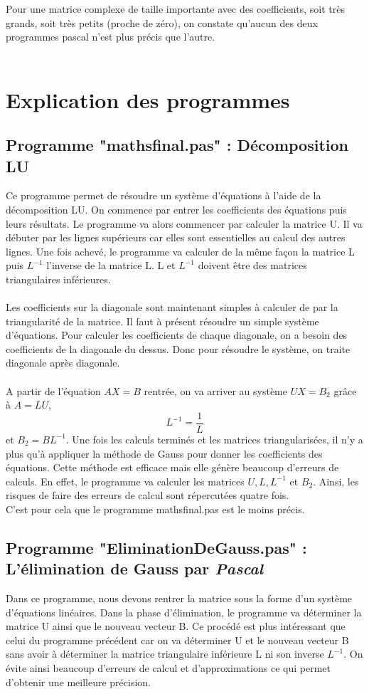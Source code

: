 \documentclass[a4paper,12pt]{report}
\begin{document}
Pour une matrice complexe de taille importante avec des coefficients, soit très grands, soit très petits (proche de zéro), on constate qu'aucun des deux programmes pascal n'est plus précis que l'autre.\\\\

\section{Explication des programmes}
\subsection{Programme "mathsfinal.pas" : Décomposition LU}

Ce programme permet de résoudre un système d'équations à l'aide de la décomposition LU.
On commence par entrer les coefficients des équations puis leurs résultats.
Le programme va alors commencer par calculer la matrice U. Il va débuter par les lignes  supérieurs car elles sont essentielles au calcul des autres lignes. Une fois achevé, le programme va calculer de la même façon la matrice L puis $L^{-1}$ l’inverse de la matrice L.
L et $L^{-1}$ doivent être des matrices triangulaires inférieures.
\\\\

Les coefficients sur la diagonale sont maintenant simples à calculer de par la triangularité de la matrice. Il faut à présent résoudre un simple système d'équations. Pour calculer les coefficients de chaque diagonale, on a besoin des coefficients de la diagonale du dessus.
Donc pour résoudre le système, on traite diagonale après diagonale.
\\\\

A partir de l'équation $AX=B$ rentrée, on va arriver au système $UX=B_2$ grâce à $A=LU$, $$L^{-1}=\frac{1}{L}$$ et $B_2=BL^{-1}$. Une fois les calculs terminés et les matrices triangularisées, il n'y a plus qu'à appliquer la méthode de Gauss pour donner les coefficients des équations.
Cette méthode est efficace mais elle génère beaucoup d'erreurs de calculs. En effet, le programme va calculer les matrices $U,L,L^{-1}$ et $B_2$. Ainsi, les risques de faire des erreurs de calcul sont répercutées quatre fois.\\
C'est pour cela que le programme mathsfinal.pas est le moins précis. 

\subsection{Programme "EliminationDeGauss.pas" : L'élimination de Gauss par \textit{Pascal}}
Dans ce programme, nous devons rentrer la matrice sous la forme d'un système d'équations linéaires. Dans la phase d'élimination, le programme va déterminer la matrice U ainsi que le nouveau vecteur B. Ce procédé est plus intéressant que celui du programme précédent car on va déterminer U et le nouveau vecteur B sans avoir à déterminer la matrice triangulaire inférieure L ni son inverse $L^{-1}$. On évite ainsi beaucoup d'erreurs de calcul et d'approximations ce qui permet d'obtenir une meilleure précision.\\
\end{document}
